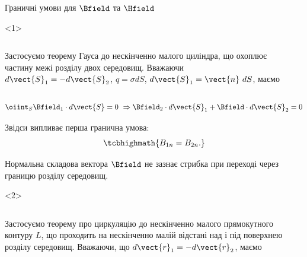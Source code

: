 \documentclass[onlytextwidth]{beamer}
\begin{document}
\begin{frame}{Граничні умови для $\Bfield$ та $\Hfield$}{}
	\begin{onlyenv}
		\begin{columns}
			\begin{column}{0.6\linewidth}
				\begin{block}{}\scriptsize\justifying
					Застосуємо теорему Гауса до нескінченно малого циліндра, що охоплює частину межі
					розділу двох
					середовищ. Вважаючи $d\vect{S}_1 = - d\vect{S}_2$, $q = \sigma dS$,
					$d\vect{S}_1 =
						\vect{n}\ dS$,
					маємо
				\end{block}
			\end{column}
			\begin{column}{0.4\linewidth}\centering
				
			\end{column}
		\end{columns}
		\begin{block}{}\scriptsize
			\begin{equation*}
				\oiint_S \Bfield_1\cdot d\vect{S} = 0\ \Rightarrow  \Bfield_2\cdot
				d\vect{S}_1 +
				\Bfield\cdot d\vect{S}_2 = 0
			\end{equation*}
		\end{block}
		\begin{block}{}
			Звідси випливає перша гранична умова:
			\begin{equation*}
				\tcbhighmath{
					B_{1n} = B_{2n}.
				}
			\end{equation*}
		\end{block}
		\begin{alertblock}{}\justifying\scriptsize
			Нормальна складова вектора $\Bfield$ не зазнає стрибка при
			переході через границю розділу середовищ.
		\end{alertblock}
	\end{onlyenv}
	\begin{onlyenv}
		\begin{columns}
			\begin{column}{0.6\linewidth}
				\begin{block}{}\scriptsize\justifying
					Застосуємо теорему про циркуляцію до нескінченно малого прямокутного
					контуру $L$, що проходить на нескінченно малій відстані над і під поверхнею
					розділу середовищ. Вважаючи, що $d\vect{r}_1 = -d\vect{r}_2$, маємо
				\end{block}
			\end{column}

\end{columns}
\end{onlyenv}
\end{frame}
\end{document}
